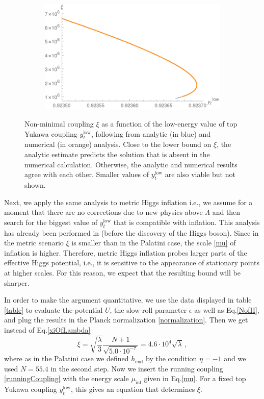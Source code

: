 \documentclass[a4paper,11pt]{article}
\makeatletter
\newcommand*{\ie}{i.e., }
\newcommand*{\Eq}{Eq.\@\xspace}
\makeatother
\begin{document}
\begin{figure}
	\centering 
	\begin{subfigure}{0.6\textwidth}
		\includegraphics[width=\textwidth]{xiOfYt0.pdf}
	\end{subfigure}
	\hspace{0.02\textwidth}
	\caption{Non-minimal coupling $\xi$ as a function of the low-energy value of top Yukawa coupling $y_t^{\text{low}}$, following from analytic (in blue) and numerical (in orange) analysis. Close to the lower bound on $\xi$, the analytic estimate predicts the solution that is absent in the numerical calculation. Otherwise, the analytic and numerical results agree with each other. Smaller values of $y_t^{\text{low}}$ are also viable but not shown.}
			\label{sfig:xiOfLambda0}
\end{figure} 

Next, we apply the same analysis to metric Higgs inflation i.e., we assume for a moment that there are no corrections due to new physics above $\Lambda$ and then search for the biggest value of $y_t^{\text{low}}$ that is compatible with inflation. This analysis has already been performed in \cite{0812.4950, 0904.1537} (before the discovery of the Higgs boson). 
Since in the metric scenario $\xi$ is smaller than in the Palatini case, the scale \eqref{mu} of inflation is higher. Therefore, metric Higgs inflation probes larger parts of the effective Higgs potential, \ie it is sensitive to the appearance of stationary points at higher scales. For this reason, we expect that the resulting bound will be sharper.


In order to make the argument quantitative, we use the data displayed in table \ref{table} to evaluate the potential $U$, the slow-roll parameter $\epsilon$ as well as \Eq \eqref{NofH}, and plug the results in the Planck normalization \eqref{normalization}. Then we get instead of \Eq \eqref{xiOfLambda}
\begin{equation}
\xi = \sqrt{\frac{\lambda}{3}}\frac{N+1}{\sqrt{5.0\cdot 10^{-7}}} = 4.6\cdot 10^4 \sqrt{\lambda} \,,
\end{equation}
where as in the Palatini case we defined $h_{\text{end}}$ by the condition $\eta=-1$ and we used $N=55.4$ in the second step.
Now we insert the running coupling \eqref{runningCoupling} with the energy scale $\mu_{\text{inf}}$ given in \Eq \eqref{mu}. For a fixed top Yukawa coupling $y_t^{\text{low}}$, this gives an equation that determines $\xi$. 
\end{document}
